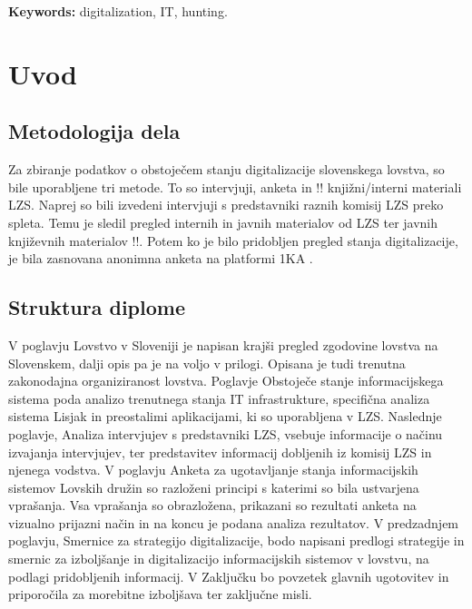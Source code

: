 \documentclass[a4paper,12pt,openright]{book}
\newcommand{\tkeywordsEn}{digitalization, IT, hunting}
\newcommand{\clearemptydoublepage}{\newpage{\pagestyle{empty}\cleardoublepage}}
\begin{document}
\noindent\textbf{Keywords:} \tkeywordsEn.
\clearemptydoublepage


\mainmatter
\setcounter{page}{1}
\pagestyle{fancy}



\chapter{Uvod}
\label{start}

\section{Metodologija dela}

Za zbiranje podatkov o obstoječem stanju digitalizacije slovenskega lovstva, so bile uporabljene tri metode.
To so intervjuji, anketa in !! knjižni/interni materiali LZS.
Naprej so bili izvedeni intervjuji s predstavniki raznih komisij LZS preko spleta.
Temu je sledil pregled internih in javnih materialov od LZS ter javnih književnih materialov !!.
Potem ko je bilo pridobljen pregled stanja digitalizacije, je bila zasnovana anonimna anketa na platformi 1KA \cite{1ka}.


\section{Struktura diplome}

V poglavju Lovstvo v Sloveniji je napisan krajši pregled zgodovine lovstva na Slovenskem, dalji opis pa je na voljo v prilogi.
Opisana je tudi trenutna zakonodajna organiziranost lovstva.
Poglavje Obstoječe stanje informacijskega sistema poda analizo trenutnega stanja IT infrastrukture, specifična analiza sistema Lisjak in preostalimi aplikacijami, ki so uporabljena v LZS.
Naslednje poglavje, Analiza intervjujev s predstavniki LZS, vsebuje informacije o načinu izvajanja intervjujev, ter predstavitev informacij dobljenih iz komisij LZS in njenega vodstva.
V poglavju Anketa za ugotavljanje stanja informacijskih sistemov Lovskih družin so razloženi principi s katerimi so bila ustvarjena vprašanja. 
Vsa vprašanja so obrazložena, prikazani so rezultati anketa na vizualno prijazni način in na koncu je podana analiza rezultatov.
V predzadnjem poglavju, Smernice za strategijo digitalizacije, bodo napisani predlogi strategije in smernic za izboljšanje in digitalizacijo informacijskih sistemov v lovstvu, na podlagi pridobljenih informacij.
V Zaključku bo povzetek glavnih ugotovitev in priporočila za morebitne izboljšava ter zaključne misli.
\end{document}
